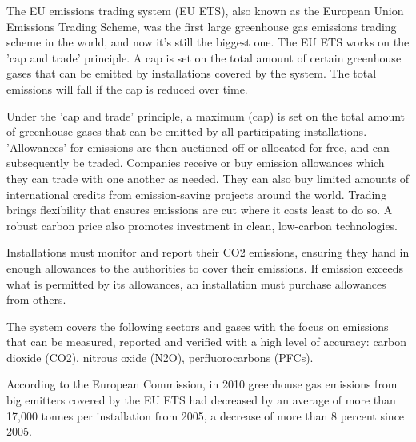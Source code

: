 The EU emissions trading system (EU ETS)\cite{EU-ETS}, also known as the European Union Emissions Trading Scheme, was the first large greenhouse gas emissions trading scheme in the world, and now it's still the biggest one. The EU ETS works on the 'cap and trade' principle. A cap is set on the total amount of certain greenhouse gases that can be emitted by installations covered by the system. The total emissions will fall if the cap is reduced over time. 

Under the 'cap and trade' principle, a maximum (cap) is set on the total amount of greenhouse gases that can be emitted by all participating installations. 'Allowances' for emissions are then auctioned off or allocated for free, and can subsequently be traded. Companies receive or buy emission allowances which they can trade with one another as needed. They can also buy limited amounts of international credits from emission-saving projects around the world. Trading brings flexibility that ensures emissions are cut where it costs least to do so. A robust carbon price also promotes investment in clean, low-carbon technologies.

Installations must monitor and report their CO2 emissions, ensuring they hand in enough allowances to the authorities to cover their emissions. If emission exceeds what is permitted by its allowances, an installation must purchase allowances from others.

The system covers the following sectors and gases with the focus on emissions that can be measured, reported and verified with a high level of accuracy: carbon dioxide (CO2), nitrous oxide (N2O), perfluorocarbons (PFCs).

According to the European Commission, in 2010 greenhouse gas emissions from big emitters covered by the EU ETS had decreased by an average of more than 17,000 tonnes per installation from 2005, a decrease of more than 8 percent since 2005.